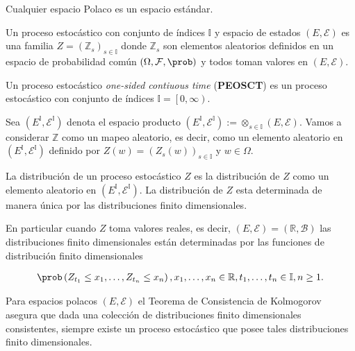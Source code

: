 \begin{Note}
Cualquier espacio Polaco es un espacio est\'andar.
\end{Note}


\begin{Def}
Un proceso estoc\'astico con conjunto de \'indices $\mathbb{I}$ y espacio de estados $\left(E,\mathcal{E}\right)$ es una familia $Z=\left(\mathbb{Z}_{s}\right)_{s\in\mathbb{I}}$ donde $\mathbb{Z}_{s}$ son elementos aleatorios definidos en un espacio de probabilidad com\'un $\left(\Omega,\mathcal{F},\prob\right)$ y todos toman valores en $\left(E,\mathcal{E}\right)$.
\end{Def}

\begin{Def}
Un proceso estoc\'astico \textit{one-sided contiuous time} (\textbf{PEOSCT}) es un proceso estoc\'astico con conjunto de \'indices $\mathbb{I}=\left[0,\infty\right)$.
\end{Def}


Sea $\left(E^{\mathbb{I}},\mathcal{E}^{\mathbb{I}}\right)$ denota el espacio producto $\left(E^{\mathbb{I}},\mathcal{E}^{\mathbb{I}}\right):=\otimes_{s\in\mathbb{I}}\left(E,\mathcal{E}\right)$. Vamos a considerar $\mathbb{Z}$ como un mapeo aleatorio, es decir, como un elemento aleatorio en $\left(E^{\mathbb{I}},\mathcal{E}^{\mathbb{I}}\right)$ definido por $Z\left(w\right)=\left(Z_{s}\left(w\right)\right)_{s\in\mathbb{I}}$ y $w\in\Omega$.

\begin{Note}
La distribuci\'on de un proceso estoc\'astico $Z$ es la distribuci\'on de $Z$ como un elemento aleatorio en $\left(E^{\mathbb{I}},\mathcal{E}^{\mathbb{I}}\right)$. La distribuci\'on de $Z$ esta determinada de manera \'unica por las distribuciones finito dimensionales.
\end{Note}

\begin{Note}
En particular cuando $Z$ toma valores reales, es decir, $\left(E,\mathcal{E}\right)=\left(\mathbb{R},\mathcal{B}\right)$ las distribuciones finito dimensionales est\'an determinadas por las funciones de distribuci\'on finito dimensionales

\begin{eqnarray}
\prob\left(Z_{t_{1}}\leq x_{1},\ldots,Z_{t_{n}}\leq x_{n}\right),x_{1},\ldots,x_{n}\in\mathbb{R},t_{1},\ldots,t_{n}\in\mathbb{I},n\geq1.
\end{eqnarray}
\end{Note}

\begin{Note}
Para espacios polacos $\left(E,\mathcal{E}\right)$ el Teorema de Consistencia de Kolmogorov asegura que dada una colecci\'on de distribuciones finito dimensionales consistentes, siempre existe un proceso estoc\'astico que posee tales distribuciones finito dimensionales.
\end{Note}


